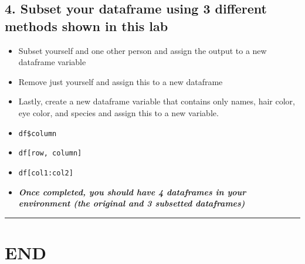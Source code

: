 \documentclass[
]{article}
\begin{document}
\hypertarget{subset-your-dataframe-using-3-different-methods-shown-in-this-lab}{%
\subsection{\texorpdfstring{\textbf{4. Subset your dataframe using 3
different methods shown in this
lab}}{4. Subset your dataframe using 3 different methods shown in this lab}}\label{subset-your-dataframe-using-3-different-methods-shown-in-this-lab}}

\begin{itemize}
\item
  Subset yourself and one other person and assign the output to a new
  dataframe variable
\item
  Remove just yourself and assign this to a new dataframe
\item
  Lastly, create a new dataframe variable that contains only names, hair
  color, eye color, and species and assign this to a new variable.
\item
  \texttt{df\$column}
\item
  \texttt{df{[}row,\ column{]}}
\item
  \texttt{df{[}col1:col2{]}}
\item
  \textbf{\emph{Once completed, you should have 4 dataframes in your
  environment (the original and 3 subsetted dataframes)}}
\end{itemize}

\begin{center}\rule{0.5\linewidth}{0.5pt}\end{center}

\hypertarget{end}{%
\section{\texorpdfstring{\textbf{END}}{END}}\label{end}}
\end{document}
